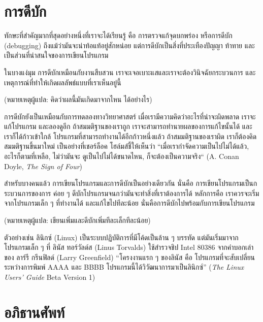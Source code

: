 \section{การดีบัก}

ทักษะที่สำคัญมากที่สุดอย่างหนึ่งที่เราจะได้เรียนรู้ คือ การตรวจแก้จุดบกพร่อง หรือการดีบัก (debugging)
ถึงแม้ว่ามันจะน่าท้อแท้อยู่สักหน่อย แต่การดีบักเป็นสิ่งที่ประเทืองปัญญา ท้าทาย 
และเป็นส่วนที่น่าสนใจของการเขียนโปรแกรม 


ในบางแง่มุม การดีบักเหมือนกับงานสืบสวน เราจะเจอเบาะแสและเราจะต้องวินิจฉัยกระบวนการ
และเหตุการณ์ที่ทำให้เกิดผลลัพธ์แบบที่เราเห็นอยู่นี้ 

(หมายเหตุผู้แปล: คิดว่าผลนี้มันเกิดมาจากไหน ได้อย่างไร)

การดีบักยังเป็นเหมือนกับการทดลองทางวิทยาศาสตร์ เมื่อเรามีความคิดว่าอะไรที่น่าจะผิดพลาด เราจะแก้โปรแกรม
และลองดูอีก ถ้าสมมติฐานของเราถูก เราจะสามารถทำนายผลของการแก้ไขนั้นได้ และเราก็ได้ก้าวเข้าใกล้
โปรแกรมที่สามารถทำงานได้อีกก้าวหนึ่งแล้ว ถ้าสมมติฐานของเราผิด เราก็ต้องคิดสมมติฐานขึ้นมาใหม่
เป็นอย่างที่เชอร์ล็อค โฮล์มส์ชี้ให้เห็นว่า ``เมื่อเรากำจัดความเป็นไปไม่ได้แล้ว, อะไรก็ตามที่เหลือ, ไม่ว่ามันจะ
ดูเป็นไปไม่ได้ขนาดไหน, ก็จะต้องเป็นความจริง`` (A. Conan Doyle, {\em The Sign of Four})

สำหรับบางคนแล้ว การเขียนโปรแกรมและการดีบักเป็นอย่างเดียวกัน นั่นคือ การเขียนโปรแกรมเป็นกระบวนการของการ
ค่อย ๆ ดีบักโปรแกรมจนกว่ามันจะทำสิ่งที่เราต้องการได้ หลักการคือ เราควรจะเริ่มจากโปรแกรมเล็ก ๆ ที่ทำงานได้
และแก้ไขไปทีละน้อย นั่นคือการดีบักไปพร้อมกับการเขียนโปรแกรม 

(หมายเหตุผู้แปล: เขียนเพิ่มและดีบักเพิ่มทีละเล็กทีละน้อย)

ตัวอย่างเช่น ลินิกซ์ (Linux) เป็นระบบปฏิบัติการที่มีโค้ดเป็นล้าน ๆ บรรทัด แต่มันเริ่มมาจากโปรแกรมเล็ก ๆ ที่
ลินัส ทอร์วัลด์ส (Linus Torvalds) ใช้สำรวจชิป Intel 80386  จากคำบอกเล่าของ
ลาร์รี กรีนฟิลด์ (Larry Greenfield) ``โครงงานแรก ๆ ของลินัส คือ โปรแกรมที่จะสับเปลี่ยนระหว่างการพิมพ์
AAAA และ BBBB โปรแกรมนี้ได้วิวัฒนาการมาเป็นลินิกซ์'' ({\em The Linux Users' Guide} Beta Version 1)


\section{อภิธานศัพท์}

